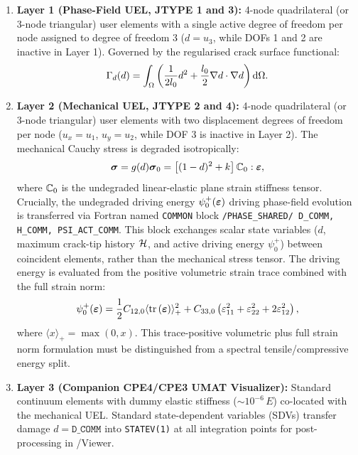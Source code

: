 \begin{enumerate}
  \item \textbf{Layer 1 (Phase-Field UEL, JTYPE 1 and 3):} 4-node quadrilateral (or 3-node triangular) user elements with a single active degree of freedom per node assigned to degree of freedom 3 ($d = u_3$, while DOFs 1 and 2 are inactive in Layer 1). Governed by the regularised crack surface functional:
  \begin{equation}
    \Gamma_d(d) = \int_\Omega \left( \frac{1}{2 l_0} d^2 + \frac{l_0}{2} \nabla d \cdot \nabla d \right) \mathrm{d}\Omega.
    \label{eq:crack_surface_functional}
  \end{equation}
  \item \textbf{Layer 2 (Mechanical UEL, JTYPE 2 and 4):} 4-node quadrilateral (or 3-node triangular) user elements with two displacement degrees of freedom per node ($u_x = u_1$, $u_y = u_2$, while DOF 3 is inactive in Layer 2). The mechanical Cauchy stress is degraded isotropically:
  \begin{equation}
    \boldsymbol{\sigma} = g(d) \boldsymbol{\sigma}_0 = \left[ (1-d)^2 + k \right] \mathbb{C}_0 : \boldsymbol{\varepsilon},
    \label{eq:degraded_stress}
  \end{equation}
  where $\mathbb{C}_0$ is the undegraded linear-elastic plane strain stiffness tensor. Crucially, the undegraded driving energy $\psi_0^+(\boldsymbol{\varepsilon})$ driving phase-field evolution is transferred via Fortran named \texttt{COMMON} block \texttt{/PHASE\_SHARED/ D\_COMM, H\_COMM, PSI\_ACT\_COMM}. This block exchanges scalar state variables ($d$, maximum crack-tip history $\mathcal{H}$, and active driving energy $\psi_0^+$) between coincident elements, rather than the mechanical stress tensor. The driving energy is evaluated from the positive volumetric strain trace combined with the full strain norm:
  \begin{equation}
    \psi_0^+(\boldsymbol{\varepsilon}) = \frac{1}{2} C_{12,0} \langle \text{tr}\left(\boldsymbol{\varepsilon}\right) \rangle_+^2 + C_{33,0} \left( \varepsilon_{11}^2 + \varepsilon_{22}^2 + 2 \varepsilon_{12}^2 \right),
    \label{eq:uel_driving_energy}
  \end{equation}
  where $\langle x \rangle_+ = \max(0, x)$. This trace-positive volumetric plus full strain norm formulation must be distinguished from a spectral tensile/compressive energy split.
  \item \textbf{Layer 3 (Companion CPE4/CPE3 UMAT Visualizer):} Standard continuum elements with dummy elastic stiffness ($\sim 10^{-6}\,E$) co-located with the mechanical UEL. Standard state-dependent variables (SDVs) transfer damage $d = \texttt{D\_COMM}$ into \texttt{STATEV(1)} at all integration points for post-processing in \Abaqus/Viewer.
\end{enumerate}

